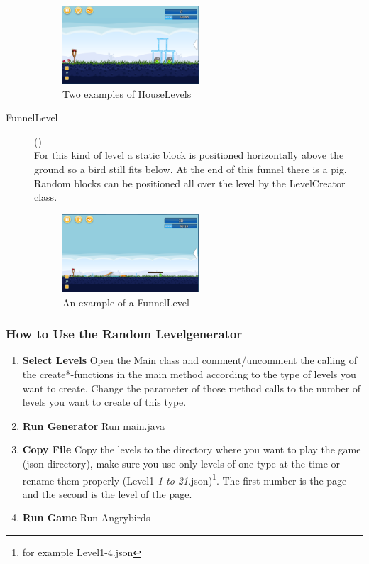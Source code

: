 \begin{description}
\begin{figure}[tbh!]
		\includegraphics[width=0.5\textwidth]{img/HouseLevel2.png}
		\caption{Two examples of HouseLevels}
		\end{figure}
	\item[FunnelLevel]()\\
		For this kind of level a static block is positioned horizontally above the ground so a bird still fits below. At the end of this funnel there is a pig. Random blocks can be positioned all over the level by the LevelCreator class.
		\begin{figure}[tbh!]
			\centering
			\includegraphics[width=0.5\textwidth]{img/FunnelLevel.png}
			\caption{An example of a FunnelLevel}
		\end{figure}
		\end{description}
\subsubsection{How to Use the Random Levelgenerator}
	\begin{enumerate}
		\item \textbf{Select Levels} Open the Main class and comment/uncomment the calling of the create*-functions in the main method according to the type of levels you want to create. Change the parameter of those method calls to the number of levels you want to create of this type.
		\item \textbf{Run Generator} Run main.java
		\item \textbf{Copy File} Copy the levels to the directory where you want to play the game (json directory), make sure you use only levels of one type at the time or rename them properly (Level1-\textit{1 to 21}.json)\footnote{for example Level1-4.json}. The first number is the page and the second is the level of the page.
		\item \textbf{Run Game} Run Angrybirds
	\end{enumerate}
